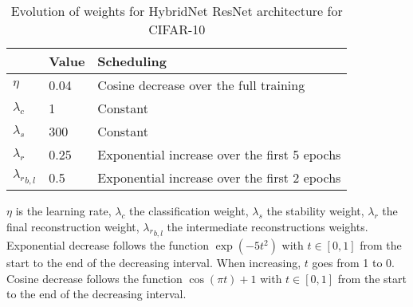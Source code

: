 \documentclass[runningheads]{llncs}
\begin{document}
\begin{table}[htbp]
\centering
\caption{Evolution of weights for HybridNet ResNet architecture for CIFAR-10}
\label{tab:resnetsched}
\begin{threeparttable}
\setlength{\tabcolsep}{4pt}
\begin{tabular}{ l l l}
\toprule
 & Value & Scheduling \\
\midrule
$\eta$ & 0.04 & Cosine decrease over the full training \\
$\lambda_c$ & 1 & Constant \\
$\lambda_s$ & 300 & Constant \\
$\lambda_r$ & 0.25 & Exponential increase over the first 5 epochs \\
${\lambda_r}_{b,l}$ & 0.5 & Exponential increase over the first 2 epochs \\
\bottomrule
\end{tabular}
\begin{tablenotes}
$\eta$ is the learning rate, $\lambda_c$ the classification weight, $\lambda_s$ the stability weight, $\lambda_r$ the final reconstruction weight, ${\lambda_r}_{b,l}$ the intermediate reconstructions weights.\\
Exponential decrease follows the function $\exp(-5t^2)$ with $t\in[0,1]$ from the start to the end of the decreasing interval. When increasing, $t$ goes from 1 to 0.\\
Cosine decrease follows the function $\cos(\pi t)+1$ with $t\in[0,1]$ from the start to the end of the decreasing interval.
\end{tablenotes}
\end{threeparttable}
\end{table}
\end{document}
